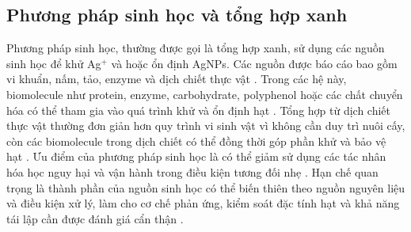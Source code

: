 \subsection{Phương pháp sinh học và tổng hợp xanh}
Phương pháp sinh học, thường được gọi là tổng hợp xanh, sử dụng các nguồn sinh học để khử Ag$^+$ và hoặc ổn định AgNPs.
Các nguồn được báo cáo bao gồm vi khuẩn, nấm, tảo, enzyme và dịch chiết thực vật \parencite{siddiqi2018,iravani2014}.
Trong các hệ này, biomolecule như protein, enzyme, carbohydrate, polyphenol hoặc các chất chuyển hóa có thể tham gia vào quá trình khử và ổn định hạt \parencite{siddiqi2018}.
Tổng hợp từ dịch chiết thực vật thường đơn giản hơn quy trình vi sinh vật vì không cần duy trì nuôi cấy, còn các biomolecule trong dịch chiết có thể đồng thời góp phần khử và bảo vệ hạt \parencite{siddiqi2018}.
Ưu điểm của phương pháp sinh học là có thể giảm sử dụng các tác nhân hóa học nguy hại và vận hành trong điều kiện tương đối nhẹ \parencite{siddiqi2018,nguyen2023}.
Hạn chế quan trọng là thành phần của nguồn sinh học có thể biến thiên theo nguồn nguyên liệu và điều kiện xử lý, làm cho cơ chế phản ứng, kiểm soát đặc tính hạt và khả năng tái lập cần được đánh giá cẩn thận \parencite{siddiqi2018}.
\par
